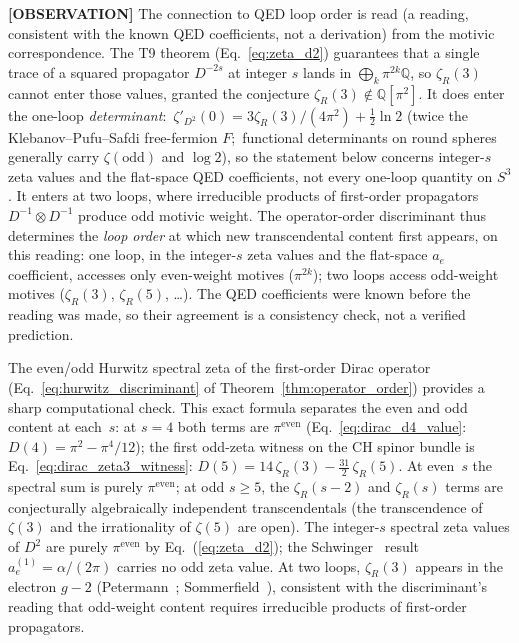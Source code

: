 \documentclass[aps,pra,twocolumn,superscriptaddress,longbibliography]{revtex4-2}
\begin{document}
\textbf{[OBSERVATION]} The connection to QED loop order is read (a
reading, consistent with the known QED coefficients, not a derivation)
from the motivic correspondence.  The T9 theorem
(Eq.~\ref{eq:zeta_d2}) guarantees that a single trace of a squared
propagator $D^{-2s}$ at integer $s$ lands in $\bigoplus_k \pi^{2k}\mathbb{Q}$, so
$\zeta_R(3)$ cannot enter those values, granted the conjecture
$\zeta_R(3) \notin \mathbb{Q}[\pi^2]$.  It does enter the one-loop
\emph{determinant}:\ $\zeta'_{D^2}(0) = 3\zeta_R(3)/(4\pi^2) + \tfrac12\ln 2$ (twice the
Klebanov--Pufu--Safdi free-fermion $F$;\ functional determinants on
round spheres generally carry $\zeta(\mathrm{odd})$ and $\log 2$), so the
statement below concerns integer-$s$ zeta values and the flat-space QED
coefficients, not every one-loop quantity on $S^3$.
It enters at two loops, where irreducible products of first-order
propagators $D^{-1} \otimes D^{-1}$ produce odd motivic weight.  The
operator-order discriminant thus determines the \emph{loop order} at
which new transcendental content first appears, on this reading: one
loop, in the integer-$s$ zeta values and the flat-space $a_e$
coefficient, accesses only even-weight motives ($\pi^{2k}$); two loops access
odd-weight motives ($\zeta_R(3)$, $\zeta_R(5)$, \ldots).  The QED
coefficients were known before the reading was made, so their agreement
is a consistency check, not a verified prediction.

The even/odd Hurwitz spectral zeta of the first-order Dirac operator
(Eq.~\ref{eq:hurwitz_discriminant} of Theorem~\ref{thm:operator_order})
provides a sharp computational check.
This exact formula separates the even and odd content at each~$s$:
at $s = 4$ both terms are $\pi^{\text{even}}$
(Eq.~\ref{eq:dirac_d4_value}: $D(4) = \pi^2 - \pi^4/12$); the first
odd-zeta witness on the CH spinor bundle is
Eq.~\eqref{eq:dirac_zeta3_witness}: $D(5) = 14\,\zeta_R(3) -
\tfrac{31}{2}\,\zeta_R(5)$.  At even~$s$ the spectral sum is purely
$\pi^{\text{even}}$; at odd $s \ge 5$, the $\zeta_R(s{-}2)$ and
$\zeta_R(s)$ terms are conjecturally algebraically independent
transcendentals (the transcendence of $\zeta(3)$ and the irrationality
of $\zeta(5)$ are open).  The integer-$s$ spectral zeta values of $D^2$ are
purely $\pi^{\text{even}}$ by Eq.~(\ref{eq:zeta_d2}); the
Schwinger~\cite{schwinger1948} result $a_e^{(1)} = \alpha/(2\pi)$
carries no odd zeta value.  At two loops, $\zeta_R(3)$ appears in the electron $g{-}2$
(Petermann~\cite{petermann1957}; Sommerfield~\cite{sommerfield1957}), consistent with
the discriminant's reading that odd-weight content requires
irreducible products of first-order propagators.
\end{document}
